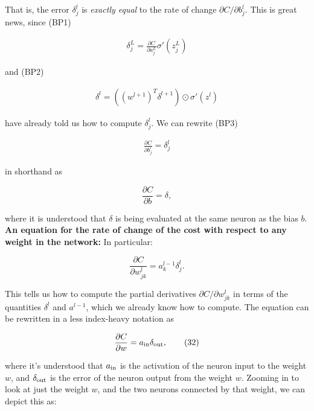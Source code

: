\noindent That is, the error $\delta^l_j$ is \emph{exactly equal} to the rate of change $\partial C / \partial b^l_j$. This is great news, since (BP1)

\begin{align*}
\delta^L_j = \frac{\partial C}{\partial a^L_j} \sigma'(z^L_j) \nonumber
\end{align*}

\noindent and (BP2)

\begin{align*}
\delta^l = ((w^{l+1})^T \delta^{l+1}) \odot \sigma'(z^l) \nonumber
\end{align*}

\noindent have already told us how to compute $\delta^l_j$. We can rewrite (BP3)

\begin{align*}
\frac{\partial C}{\partial b^l_j} = \delta^l_j \nonumber
\end{align*}

\noindent in shorthand as

\begin{equation}
\frac{\partial C}{\partial b} = \delta,
\tag{31}
\end{equation}

\noindent where it is understood that $\delta$ is being evaluated at the same neuron as the bias $b$. \textbf{An equation for the rate of change of the cost with respect to any weight in the network:} In particular:

\begin{equation}
\frac{\partial C}{\partial w^l_{jk}} = a^{l-1}_k \delta^l_j.
\tag{BP4}
\end{equation}

\noindent This tells us how to compute the partial derivatives $\partial C / \partial w^l_{jk}$ in terms of the quantities $\delta^l$ and $a^{l-1}$, which we already know how to compute. The equation can be rewritten in a less index-heavy notation as

\begin{equation}
\frac{\partial C}{\partial w} = a_{\rm in} \delta_{\rm out},
\tag{32}
\end{equation}

\noindent where it's understood that $a_{\rm in}$ is the activation of the neuron input to the weight $w$, and $\delta_{\rm out}$ is the error of the neuron output from the weight $w$. Zooming in to look at just the weight $w$, and the two neurons connected by that weight, we can depict this as:

